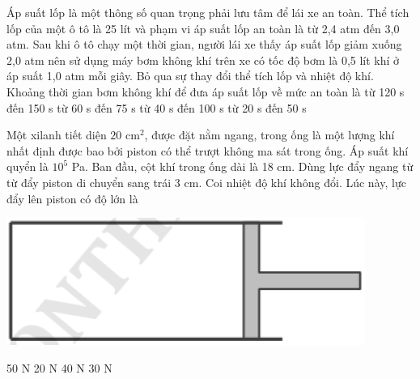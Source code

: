 \documentclass[12pt,a4paper]{article}
\begin{document}
\begin{multicols}{2}
	\begin{ex}
		Áp suất lốp là một thông số quan trọng phải lưu tâm để lái xe an toàn. Thể tích lốp của một ô tô là 25 lít và phạm vi áp suất lốp an toàn là từ 2,4 atm đến 3,0 atm. Sau khi ô tô chạy một thời gian, người lái xe thấy áp suất lốp giảm xuống 2,0 atm nên sử dụng máy bơm không khí trên xe có tốc độ bơm là 0,5 lít khí ở áp suất 1,0 atm mỗi giây. Bỏ qua sự thay đổi thể tích lốp và nhiệt độ khí. Khoảng thời gian bơm không khí để đưa áp suất lốp về mức an toàn là
		\choice
		{từ 120 s đến 150 s}
		{từ 60 s đến 75 s}
		{từ 40 s đến 100 s}
		{từ 20 s đến 50 s}
	\end{ex}
	
	\begin{ex}
		Một xilanh tiết diện $20 \text{ cm}^2$, được đặt nằm ngang, trong ống là một lượng khí nhất định được bao bởi piston có thể trượt không ma sát trong ống. Áp suất khí quyển là $10^5$ Pa. Ban đầu, cột khí trong ống dài là 18 cm. Dùng lực đẩy ngang từ từ đẩy piston di chuyển sang trái 3 cm. Coi nhiệt độ khí không đổi. Lúc này, lực đẩy lên piston có độ lớn là
			\begin{center}
			\includegraphics[scale=0.3]{img/2.png}
		\end{center}
		\choice
		{50 N}
		{20 N}
		{40 N}
		{30 N}
	\end{ex}
	

\end{multicols}
\end{document}
